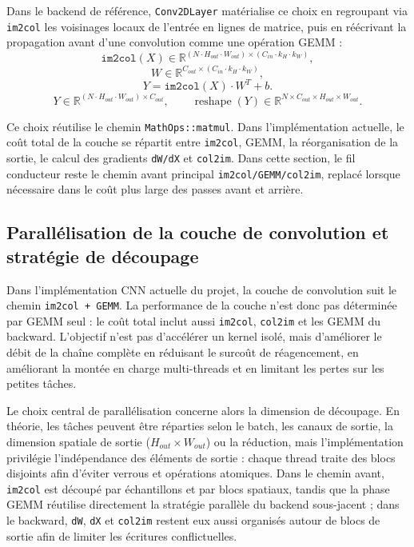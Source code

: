 \documentclass[a4paper,11pt,oneside]{article}
\begin{document}
Dans le backend de référence, \texttt{Conv2DLayer} matérialise ce choix en regroupant via \texttt{im2col} les voisinages locaux de l'entrée en lignes de matrice, puis en réécrivant la propagation avant d'une convolution comme une opération GEMM :
\[
\texttt{im2col}(X) \in \mathbb{R}^{(N \cdot H_{out} \cdot W_{out}) \times (C_{in}\cdot k_H \cdot k_W)},
\]
\[
W \in \mathbb{R}^{C_{out} \times (C_{in}\cdot k_H \cdot k_W)},
\]
\[
Y = \texttt{im2col}(X)\cdot W^T + b.
\]
\[
Y \in \mathbb{R}^{(N \cdot H_{out} \cdot W_{out}) \times C_{out}},
\qquad
\operatorname{reshape}(Y) \in \mathbb{R}^{N \times C_{out} \times H_{out} \times W_{out}}.
\]

Ce choix réutilise le chemin \texttt{MathOps::matmul}. Dans l'implémentation actuelle, le coût total de la couche se répartit entre \texttt{im2col}, GEMM, la réorganisation de la sortie, le calcul des gradients \texttt{dW/dX} et \texttt{col2im}. Dans cette section, le fil conducteur reste le chemin avant principal \texttt{im2col/GEMM/col2im}, replacé lorsque nécessaire dans le coût plus large des passes avant et arrière.

\subsection{Parallélisation de la couche de convolution et stratégie de découpage}

Dans l'implémentation CNN actuelle du projet, la couche de convolution suit le chemin \texttt{im2col + GEMM}. La performance de la couche n'est donc pas déterminée par GEMM seul : le coût total inclut aussi \texttt{im2col}, \texttt{col2im} et les GEMM du backward. L'objectif n'est pas d'accélérer un kernel isolé, mais d'améliorer le débit de la chaîne complète en réduisant le surcoût de réagencement, en améliorant la montée en charge multi-threads et en limitant les pertes sur les petites tâches.

Le choix central de parallélisation concerne alors la dimension de découpage. En théorie, les tâches peuvent être réparties selon le batch, les canaux de sortie, la dimension spatiale de sortie ($H_{out}\times W_{out}$) ou la réduction, mais l'implémentation privilégie l'indépendance des éléments de sortie : chaque thread traite des blocs disjoints afin d'éviter verrous et opérations atomiques. Dans le chemin avant, \texttt{im2col} est découpé par échantillons et par blocs spatiaux, tandis que la phase GEMM réutilise directement la stratégie parallèle du backend sous-jacent ; dans le backward, \texttt{dW}, \texttt{dX} et \texttt{col2im} restent eux aussi organisés autour de blocs de sortie afin de limiter les écritures conflictuelles.
\end{document}
